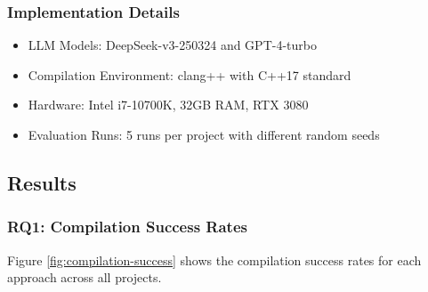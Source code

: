 \subsubsection{Implementation Details}
\begin{itemize}
\item LLM Models: DeepSeek-v3-250324 and GPT-4-turbo
\item Compilation Environment: clang++ with C++17 standard
\item Hardware: Intel i7-10700K, 32GB RAM, RTX 3080
\item Evaluation Runs: 5 runs per project with different random seeds
\end{itemize}

\subsection{Results}

\subsubsection{RQ1: Compilation Success Rates}

Figure \ref{fig:compilation-success} shows the compilation success rates for each approach across all projects.


